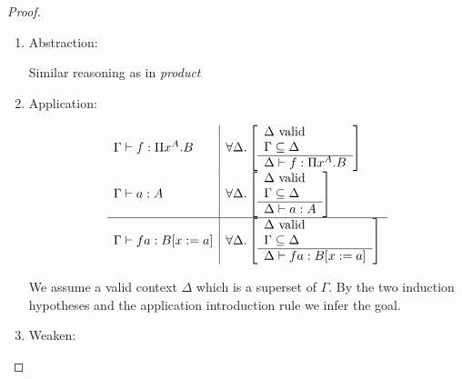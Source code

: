 \begin{theorem}
\begin{proof}
\begin{enumerate}
        \item Abstraction:

            Similar reasoning as in \emph{product}

        \item Application:

            $$
            \begin{array}{l|l}
                \Gamma \vdash f: \Pi x^A. B
                &
                \forall \Delta
                    . \left[\begin{array}{l} 
                        \Delta \text{ valid}
                        \\
                        \Gamma \subseteq \Delta
                     \\ \hline 
                        \Delta \vdash f: \Pi x^A. B
                    \end{array}\right]
                \\
                \Gamma \vdash a: A
                &
                \forall \Delta
                    . \left[\begin{array}{l} 
                        \Delta \text{ valid}
                        \\
                        \Gamma \subseteq \Delta
                     \\ \hline 
                        \Delta \vdash a: A
                    \end{array}\right]
                \\
                \hline
                \Gamma \vdash f a: B[x:=a]
                &
                \forall \Delta
                    . \left[\begin{array}{l} 
                        \Delta \text{ valid}
                        \\
                        \Gamma \subseteq \Delta
                     \\ \hline 
                        \Delta \vdash f a : B[x:=a]
                    \end{array}\right]
            \end{array}
            $$

            We assume a valid context $\Delta$ which is a superset of $\Gamma$.
            By the two induction hypotheses and the application introduction
            rule we infer the goal.

        \item Weaken:


\end{enumerate}
\end{proof}
\end{theorem}
